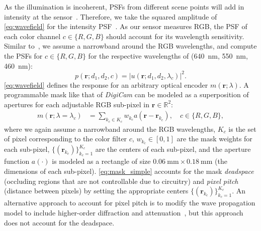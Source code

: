 As the illumination is incoherent, PSFs from different scene points will add in intensity at the sensor~\cite{Goodman2004}.
Therefore, we take the squared amplitude of \cref{eq:wavefield} for the intensity PSF~\cite{Goodman2004}.
As our sensor measures RGB, the PSF of each color channel $c \in \{R,G,B\}$ should account for its wavelength sensitivity.
Similar to~\cite{sitzmann2018e2e}, we assume a narrowband around the RGB wavelengths, and compute the PSFs for $ c\in\{R,G,B\} $ for the respective wavelengths of (\SI{640}{\nano\meter}, \SI{550}{\nano\meter}, \SI{460}{\nano\meter}):
\begin{equation}
	\label{eq:intensity_psf_simple}
	p(\bm{r}; d_1, d_2, c) = | u(\bm{r}; d_1, d_2, \lambda_c)|^2.
\end{equation}
\cref{eq:wavefield} defines the response for an arbitrary optical encoder $m(\bm{r}; \lambda)$.
A programmable mask like that of \textit{DigiCam} can be modeled as a superposition of apertures for each adjustable RGB sub-pixel in $ \bm{r} \in \mathbb{R}^2 $:
\begin{align}
	\label{eq:mask_simple}
	m(\bm{r}; \lambda=\lambda_c) &= \sum_{k_c \in K_c}
	w_{k_c}
	a(\bm{r} -\bm{r}_{k_c}), \quad c\in\{R,G,B\},
\end{align}
where we again assume a narrowband around the RGB wavelengths,
$K_c$ is the set of pixel corresponding to the color filter $c$,
$w_{k_c} \in [0, 1]$ are the mask weights for each sub-pixel, $ \{(\bm{r}_{k_c})\}_{k_c=1}^{K_c} $ are the centers of each sub-pixel, 
and the aperture function $a(\cdot)$ is modeled as a rectangle of size $\SI{0.06}{\milli\meter}\times\SI{0.18}{\milli\meter}$ (the dimensions of each sub-pixel).
\cref{eq:mask_simple} accounts for the mask \textit{deadspace} (occluding regions that are not controllable due to circuitry) and \textit{pixel pitch} (distance between pixels) by setting the appropriate centers $ \{(\bm{r}_{k_c})\}_{k_c=1}^{K_c} $.
An alternative approach to account for pixel pitch is to modify the wave propagation model to include higher-order diffraction and attenuation~\cite{Gopakumar:21}, but this approach does not account for the deadspace.

